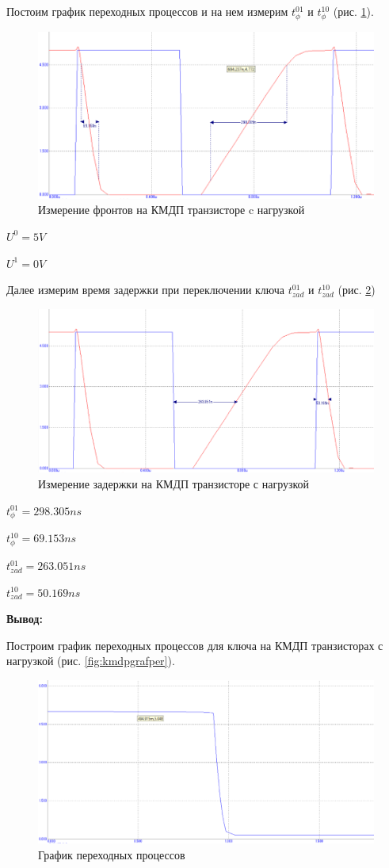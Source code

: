 \documentclass[a4paper,14pt]{article}
\begin{document}
Постоим график переходных процессов и на нем измерим $t^{01}_{\phi}$ и $t^{10}_{\phi}$ (рис.  \ref{fig:kmdpgraffrnagr}).

\begin{figure}[H]
	\centering
	\includegraphics[width=0.7\linewidth]{image/KMDP_graf_fr_nagr}
	\caption{Измерение фронтов на КМДП транзисторе c нагрузкой}
	\label{fig:kmdpgraffrnagr}
\end{figure}

$U^0 = 5V$

$U^1 = 0V$

Далее измерим время задержки при переключении ключа $t^{01}_{zad}$ и $t^{10}_{zad}$ (рис. \ref{fig:kmdpgrafzadnagr})

\begin{figure}[H]
	\centering
	\includegraphics[width=0.7\linewidth]{image/KMDP_graf_zad_nagr}
	\caption{Измерение задержки на КМДП транзисторе с нагрузкой}
	\label{fig:kmdpgrafzadnagr}
\end{figure}

$t^{01}_{\phi} = 298.305ns$

$t^{10}_{\phi} = 69.153ns$

$t^{01}_{zad} = 263.051ns$

$t^{10}_{zad} = 50.169ns$

\textbf{Вывод: } 

Построим график переходных процессов для ключа на КМДП транзисторах с нагрузкой (рис. \ref{fig:kmdpgrafper}).

\begin{figure}[H]
	\centering
	\includegraphics[width=0.7\linewidth]{image/KMDP_graf_per1}
	\caption{График переходных процессов }
	\label{fig:kmdpgrafper1}
\end{figure}
\end{document}
